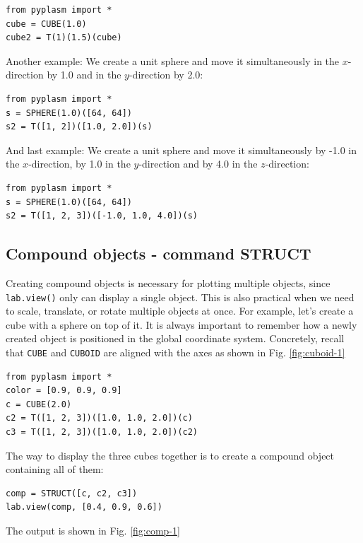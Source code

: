 \documentclass[article,A4,12pt]{llncs}
\begin{document}
\begin{verbatim}
from pyplasm import *
cube = CUBE(1.0)
cube2 = T(1)(1.5)(cube)
\end{verbatim}
Another example: We create a unit sphere and move it simultaneously 
in the $x$-direction by 1.0 and in the $y$-direction by 2.0:

\begin{verbatim}
from pyplasm import *
s = SPHERE(1.0)([64, 64])
s2 = T([1, 2])([1.0, 2.0])(s)
\end{verbatim}
And last example: We create a unit sphere and  
move it simultaneously by -1.0 in the $x$-direction, by 1.0 in the $y$-direction
and by 4.0 in the $z$-direction:

\begin{verbatim}
from pyplasm import *
s = SPHERE(1.0)([64, 64])
s2 = T([1, 2, 3])([-1.0, 1.0, 4.0])(s)
\end{verbatim}

\subsection{Compound objects - command STRUCT}

Creating compound objects is necessary
for plotting multiple objects, since {\tt lab.view()} only can 
display a single object. This is also practical 
when we need to scale, translate, or rotate multiple objects at
once. For example, let's create a cube with a sphere on top of it.
It is always important to remember how a newly created
object is positioned in the global coordinate system. Concretely,
recall that {\tt CUBE} and {\tt CUBOID} are aligned with the 
axes as shown in Fig. \ref{fig:cuboid-1}

\begin{verbatim}
from pyplasm import *
color = [0.9, 0.9, 0.9]
c = CUBE(2.0)
c2 = T([1, 2, 3])([1.0, 1.0, 2.0])(c)
c3 = T([1, 2, 3])([1.0, 1.0, 2.0])(c2)
\end{verbatim}
The way to display the three cubes together
is to create a compound object containing all of them:

\begin{verbatim}
comp = STRUCT([c, c2, c3])
lab.view(comp, [0.4, 0.9, 0.6])
\end{verbatim}
The output is shown in Fig. \ref{fig:comp-1}

\newpage
\end{document}
